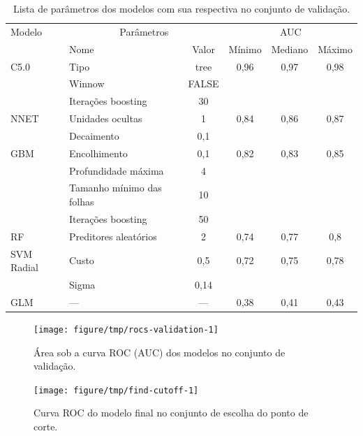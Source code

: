 \documentclass[a4paper,titlepage]{ppgi}\usepackage[]{graphicx}\usepackage[]{color}
\newenvironment{knitrout}{}{} %
\begin{document}
\begin{table}
\centering
\begin{tabular}{l l c c c c}
  Modelo & \multicolumn{2}{c}{Parâmetros} & \multicolumn{3}{c}{AUC} \\ \cline{2-6}
  & \multicolumn{1}{|l}{Nome} & \multicolumn{1}{c|}{Valor} & Mínimo & Mediano & \multicolumn{1}{c|}{Máximo} \\
  \hline
  C5.0 & Tipo & tree & 0,96&0,97&0,98 \\
       & Winnow & FALSE & & & \\
       & Iterações boosting & 30 & & & \\
  NNET & Unidades ocultas & 1 & 0,84&0,86&0,87 \\
       & Decaimento & 0,1 & & & \\
  GBM & Encolhimento & 0,1 & 0,82&0,83&0,85 \\
      & Profundidade máxima & 4 & & & \\
      & Tamanho mínimo das folhas & 10 & & & \\
      & Iterações boosting & 50 & & & \\
  RF & Preditores aleatórios & 2 & 0,74&0,77&0,8 \\
  SVM Radial & Custo & 0,5 & 0,72&0,75&0,78 \\
             & Sigma & 0,14 & & & \\
  GLM & --- & --- & 0,38&0,41&0,43 \\
\end{tabular}
\caption{Lista de parâmetros dos modelos com sua respectiva 
no conjunto de validação.}
\label{table:resultados-validacao}
\end{table}

\begin{knitrout}
\color{fgcolor}\begin{figure}
\texttt{[image: figure/tmp/rocs-validation-1]} \caption[Área sob a curva ROC (AUC) dos modelos no conjunto de validação]{Área sob a curva ROC (AUC) dos modelos no conjunto de validação.}\label{fig:rocs-validation}
\end{figure}


\end{knitrout}



\begin{knitrout}
\color{fgcolor}\begin{figure}
\texttt{[image: figure/tmp/find-cutoff-1]} \caption[Curva ROC do modelo final no conjunto de escolha do ponto de corte]{Curva ROC do modelo final no conjunto de escolha do ponto de corte.}\label{fig:find-cutoff}
\end{figure}


\end{knitrout}
\end{document}

